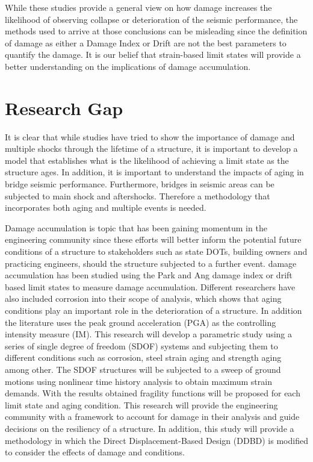 While these studies provide a general view on how damage increases the likelihood of observing collapse or deterioration of the seismic performance, the methods used to arrive at those conclusions can be misleading since the definition of damage as either a Damage Index or Drift are not the best parameters to quantify the damage. It is our belief that strain-based limit states will provide a better understanding on the implications of damage accumulation.

\section{Research Gap}

It is clear that while studies have tried to show the importance of damage and multiple shocks through the lifetime of a structure, it is important to develop a model that establishes what is the likelihood of achieving a limit state as the structure ages. In addition,  it is important to understand the impacts of aging in bridge seismic performance. Furthermore, bridges in seismic areas can be subjected to main shock and aftershocks. Therefore a methodology that incorporates both aging and multiple events is needed.

Damage accumulation is topic that has been gaining momentum in the engineering community since these efforts will better inform  the potential future conditions of a structure to stakeholders such as state DOTs, building owners and practicing engineers, should the structure subjected to a further event. damage accumulation has been studied using the Park and Ang damage index or drift based limit states to measure damage accumulation. Different researchers have also included corrosion into their scope of analysis, which shows that aging conditions play an important role in the deterioration of a structure. In addition the literature uses the peak ground acceleration (PGA) as the controlling intensity measure (IM). This research will develop a parametric study using a series of single degree of freedom (SDOF) systems and subjecting them to different conditions such as corrosion, steel strain aging and strength aging among other. The SDOF structures will be subjected to a sweep of ground motions using nonlinear time history analysis to obtain maximum strain demands. With the results obtained fragility functions will be proposed for each limit state and aging condition. This research will provide the engineering community with a framework to account for damage in their analysis and guide decisions on the resiliency of a structure. In addition, this study will provide a methodology in which the Direct Displacement-Based Design (DDBD) is modified to consider the effects of damage and conditions.

